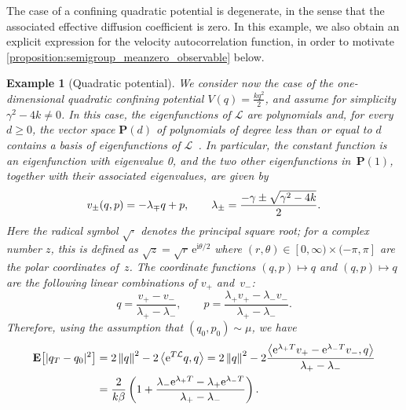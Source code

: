 \documentclass[11pt,a4paper]{article}
\newcommand{\e}{\mathrm{e}}
\newcommand{\expect}[0]{\mathbf{E}}
\newcommand{\poly}{\mathbf P}
\newcommand{\imag}{\mathrm{i}}
\theoremstyle{plain}
\newtheorem{example}{Example}[section]
\numberwithin{equation}{section}
\renewcommand{\geq}{\geqslant}
\begin{document}
The case of a confining quadratic potential is degenerate,
in the sense that the associated effective diffusion coefficient is zero.
In this example,
we also obtain an explicit expression for the velocity autocorrelation function,
in order to motivate \cref{proposition:semigroup_meanzero_observable} below.
\begin{example}
    [Quadratic potential]
    \label{example:quadratic}
    We consider now the case of the one-dimensional quadratic confining potential $V(q) = \frac{k q^2}{2}$,
    and assume for simplicity $\gamma^2 - 4 k \neq 0$.
    In this case, the eigenfunctions of $\mathcal L$ are polynomials
    and, for every $d \geq 0$, the vector space $\poly(d)$ of polynomials of degree less than or equal to $d$
    contains a basis of eigenfunctions of $\mathcal L$~\cite[Section~6.3]{pavliotis2011applied}.
    In particular, the constant function is an eigenfunction with eigenvalue 0,
    and the two other eigenfunctions in~$\poly(1)$, together with their associated eigenvalues,
    are given by
    \begin{equation*}
        v_{\pm}(q, p) =
        - \lambda_{\mp} q + p, \\
        \qquad
        \lambda_{\pm} = \frac{- \gamma \pm \sqrt{\gamma^2 - 4k}}{2}.
    \end{equation*}
    Here the radical symbol $\sqrt{\cdot}$ denotes the principal square root;
    for a complex number $z$, this is defined as $\sqrt{z} = \sqrt{r} \, \e^{\imag \theta/2}$ where $(r, \theta) \in [0, \infty) \times (-\pi, \pi]$ are the polar coordinates of~$z$.
    The coordinate functions $(q, p) \mapsto q$ and $(q, p) \mapsto q$ are the following linear combinations of $v_+$ and~$v_-$:
    \[
        q = \frac{v_+ - v_-}{\lambda_+ - \lambda_-},
        \qquad
        p = \frac{\lambda_+ v_+ - \lambda_- v_-}{\lambda_+ - \lambda_-}.
    \]
    Therefore,
    using the assumption that $(q_0, p_0) \sim \mu$,
    we have
    \begin{align*}
        \expect \bigl[ \lvert q_T - q_0 \rvert^2 \bigr]
        &= 2 \norm{q}^2 - 2 \ip{\e^{T \mathcal L}q}{q}
        = 2 \norm{q}^2 - 2 \frac{\ip{\e^{\lambda_+ T} v_+ - \e^{\lambda_- T} v_-}{q}}{\lambda_+ - \lambda_-} \\
        &= \frac{2}{k \beta} \left( 1 +  \frac{\lambda_- \e^{\lambda_+ T} - \lambda_+ \e^{\lambda_- T}}{\lambda_+ - \lambda_-} \right).

\end{align*}
\end{example}
\end{document}
